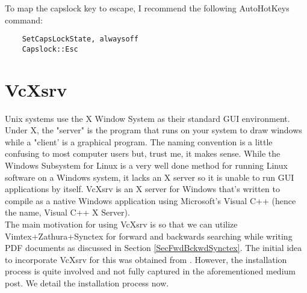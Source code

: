 To map the capslock key to escape, I recommend the following AutoHotKeys
command:
\begin{lstlisting}
    SetCapsLockState, alwaysoff
    Capslock::Esc
\end{lstlisting}

\section{VcXsrv} \label{SecVcXsrv}
Unix systems use the X Window System as their standard GUI environment.  Under
X, the "server" is the program that runs on your system to draw windows while a
"client' is a graphical program. The naming convention is a little confusing to
most computer users but, trust me, it makes sense.  While the Windows Subsystem
for Linux is a very well done method for running Linux software on a Windows
system, it lacks an X server so it is unable to run GUI applications by itself.
VcXsrv is an X server for Windows that's written to compile as a native Windows
application using Microsoft's Visual C++ (hence the name, Visual C++ X
Server).\\

The main motivation for using VcXsrv is so that we can utilize
Vimtex+Zathura+Synctex for forward and backwards searching while writing PDF
documents as discussed in Section \ref{SecFwdBckwdSynctex}. The initial idea to
incorporate VcXsrv for this was obtained from \cite{jong2020blazing}. However,
the installation process is quite involved and not fully captured in the
aforementioned medium post. We detail the installation process now.

